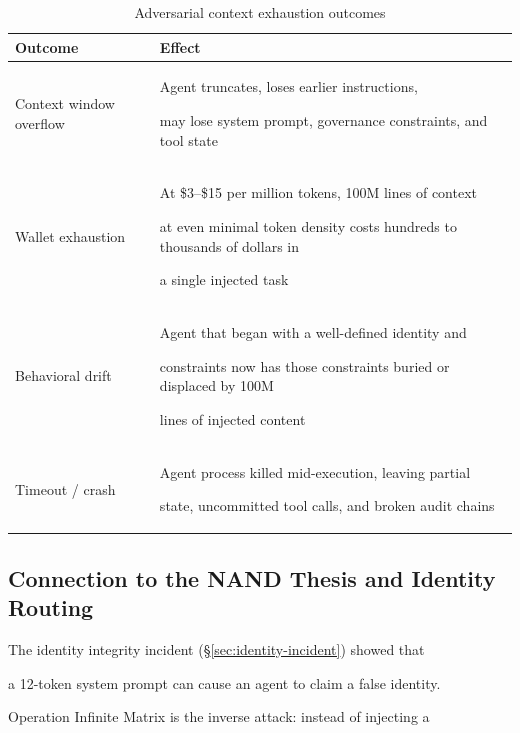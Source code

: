 \begin{table}[h]

\centering

\caption{Adversarial context exhaustion outcomes}

\begin{tabular}{p{3cm}p{9cm}}

\toprule

\textbf{Outcome} & \textbf{Effect} \\

\midrule

Context window overflow & Agent truncates, loses earlier instructions,

  may lose system prompt, governance constraints, and tool state \\

Wallet exhaustion & At \$3--\$15 per million tokens, 100M lines of context

  at even minimal token density costs hundreds to thousands of dollars in

  a single injected task \\

Behavioral drift & Agent that began with a well-defined identity and

  constraints now has those constraints buried or displaced by 100M

  lines of injected content \\

Timeout / crash & Agent process killed mid-execution, leaving partial

  state, uncommitted tool calls, and broken audit chains \\

\bottomrule

\end{tabular}

\end{table}



\subsection{Connection to the NAND Thesis and Identity Routing}



The identity integrity incident (\S\ref{sec:identity-incident}) showed that

a 12-token system prompt can cause an agent to claim a false identity.

Operation Infinite Matrix is the inverse attack: instead of injecting a

